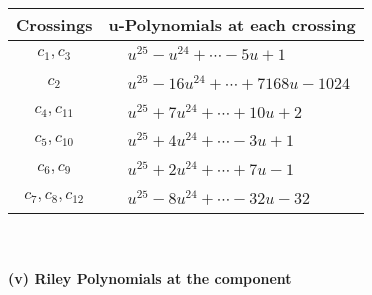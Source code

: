 \documentclass[1p]{elsarticle_modified}
\theoremstyle{definition}
\begin{document}
\begin{tabular}{m{50pt}|m{274pt}}
Crossings & \hspace{64pt}u-Polynomials at each crossing \\
\hline $$\begin{aligned}c_{1},c_{3}\end{aligned}$$&$\begin{aligned}
&u^{25}- u^{24}+\cdots-5 u+1
\end{aligned}$\\
\hline $$\begin{aligned}c_{2}\end{aligned}$$&$\begin{aligned}
&u^{25}-16 u^{24}+\cdots+7168 u-1024
\end{aligned}$\\
\hline $$\begin{aligned}c_{4},c_{11}\end{aligned}$$&$\begin{aligned}
&u^{25}+7 u^{24}+\cdots+10 u+2
\end{aligned}$\\
\hline $$\begin{aligned}c_{5},c_{10}\end{aligned}$$&$\begin{aligned}
&u^{25}+4 u^{24}+\cdots-3 u+1
\end{aligned}$\\
\hline $$\begin{aligned}c_{6},c_{9}\end{aligned}$$&$\begin{aligned}
&u^{25}+2 u^{24}+\cdots+7 u-1
\end{aligned}$\\
\hline $$\begin{aligned}c_{7},c_{8},c_{12}\end{aligned}$$&$\begin{aligned}
&u^{25}-8 u^{24}+\cdots-32 u-32
\end{aligned}$\\
\hline
\end{tabular}\\~\\
\newpage\renewcommand{\arraystretch}{1}
\flushleft \textbf{(v) Riley Polynomials at the component}\newline \\
\end{document}
